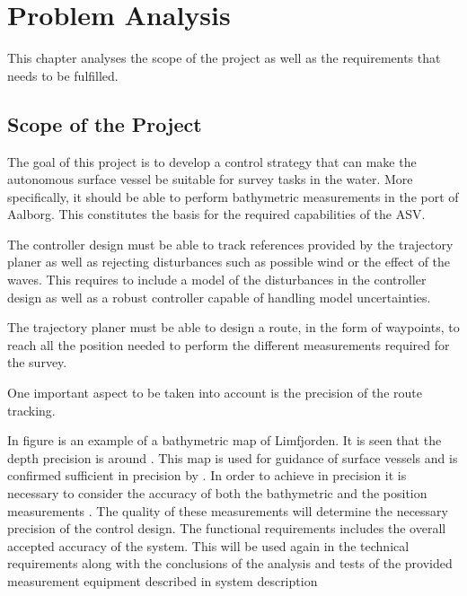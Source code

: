 \chapter{Problem Analysis}
This chapter analyses the scope of the project as well as the requirements that needs to be fulfilled. 

\section{Scope of the Project}
The goal of this project is to develop a control strategy that can make the autonomous surface vessel be suitable for survey tasks in the water. More specifically, it should be able to perform bathymetric measurements in the port of Aalborg. This constitutes the basis for the required capabilities of the ASV.

The controller design must be able to track references provided by the trajectory planer as well as rejecting disturbances such as possible wind or the effect of the waves. This requires to include a model of the disturbances in the controller design as well as a robust controller capable of handling model uncertainties.

The trajectory planer must be able to design a route, in the form of waypoints, to reach all the position needed to perform the different measurements required for the survey. 

One important aspect to be taken into account is the precision of the route tracking. %

In figure  is an example of a bathymetric map of Limfjorden. It is seen that the depth precision is around . This map is used for guidance of surface vessels and is confirmed sufficient in precision by .
In order to achieve  in precision it is necessary to consider the accuracy of both the bathymetric and the position measurements . The quality of these measurements will determine the necessary precision of the control design.
The functional requirements  includes the overall accepted accuracy of the system. This will be used again in the technical requirements  along with the conclusions of the analysis and tests of the provided measurement equipment described in system description

